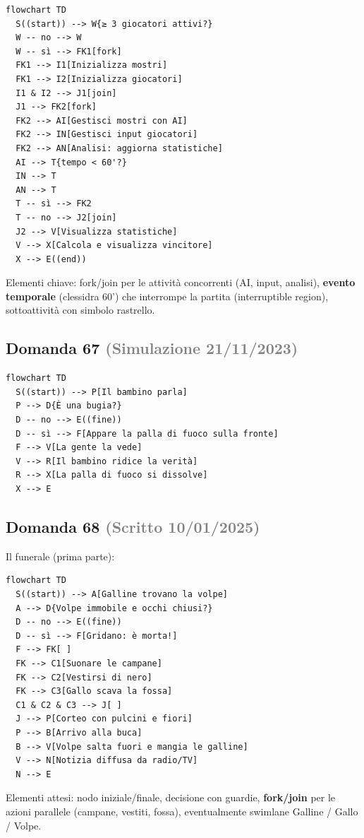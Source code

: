 \documentclass[a4paper,11pt]{article}
\begin{document}
\begin{verbatim}
flowchart TD
  S((start)) --> W{≥ 3 giocatori attivi?}
  W -- no --> W
  W -- sì --> FK1[fork]
  FK1 --> I1[Inizializza mostri]
  FK1 --> I2[Inizializza giocatori]
  I1 & I2 --> J1[join]
  J1 --> FK2[fork]
  FK2 --> AI[Gestisci mostri con AI]
  FK2 --> IN[Gestisci input giocatori]
  FK2 --> AN[Analisi: aggiorna statistiche]
  AI --> T{tempo < 60'?}
  IN --> T
  AN --> T
  T -- sì --> FK2
  T -- no --> J2[join]
  J2 --> V[Visualizza statistiche]
  V --> X[Calcola e visualizza vincitore]
  X --> E((end))
\end{verbatim}
Elementi chiave: fork/join per le attività concorrenti (AI, input, analisi), \textbf{evento temporale} (clessidra 60') che interrompe la partita (interruptible region), sottoattività con simbolo rastrello.



\subsection*{Domanda 67 \hfill {\small \textcolor{gray}{(Simulazione 21/11/2023)}}}


\begin{verbatim}
flowchart TD
  S((start)) --> P[Il bambino parla]
  P --> D{È una bugia?}
  D -- no --> E((fine))
  D -- sì --> F[Appare la palla di fuoco sulla fronte]
  F --> V[La gente la vede]
  V --> R[Il bambino ridice la verità]
  R --> X[La palla di fuoco si dissolve]
  X --> E
\end{verbatim}




\subsection*{Domanda 68 \hfill {\small \textcolor{gray}{(Scritto 10/01/2025)}}}
Il funerale (prima parte):

\begin{verbatim}
flowchart TD
  S((start)) --> A[Galline trovano la volpe]
  A --> D{Volpe immobile e occhi chiusi?}
  D -- no --> E((fine))
  D -- sì --> F[Gridano: è morta!]
  F --> FK[ ]
  FK --> C1[Suonare le campane]
  FK --> C2[Vestirsi di nero]
  FK --> C3[Gallo scava la fossa]
  C1 & C2 & C3 --> J[ ]
  J --> P[Corteo con pulcini e fiori]
  P --> B[Arrivo alla buca]
  B --> V[Volpe salta fuori e mangia le galline]
  V --> N[Notizia diffusa da radio/TV]
  N --> E
\end{verbatim}
Elementi attesi: nodo iniziale/finale, decisione con guardie, \textbf{fork/join} per le azioni parallele (campane, vestiti, fossa), eventualmente swimlane Galline / Gallo / Volpe.
\end{document}
